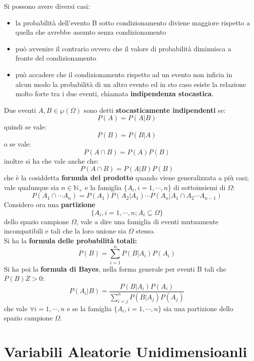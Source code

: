 \documentclass[a4paper,12pt, oneside]{book}
\begin{document}
Si possono avere diversi casi:
\begin{itemize}
    \item la probabilità dell’evento B sotto condizionamento diviene maggiore rispetto a quella che avrebbe assunto senza condizionamento
    \item può avvenire il contrario ovvero che il valore di probabilità diminuisca a fronte del condizionamento
    \item può accadere che il condizionamento rispetto ad un evento non inficia in alcun modo la probabilità di 
          un altro evento ed in sto caso esiste la relazione molto forte tra i due eventi, chiamata \textbf{indipendenza stocastica}.
\end{itemize}
Due eventi $A,B\in\wp(\Omega)$ sono detti \textbf{stocasticamente indipendenti} se:
\[P(A)=P(A|B)\]
quindi se vale:
\[P(B)=P(B|A)\]
o se vale:
\[P(A\cap B)=P(A)P(B)\]
inoltre si ha che vale anche che:
\[P(A\cap B)=P(A|B)P(B)\]
che è la cosiddetta \textbf{formula del prodotto} quando viene generalizzata a più casi; vale qualunque sia $n\in \mathbb{N}_+$ e la famiglia $\{A_i,i=1,\cdots, n\}$ di sottoinsiemi di $\Omega$:
\[P(A_1\cap\cdots A_n)=P(A_1)P(A_2|A_1)\cdots P(A_n|A_1\cap A_2\cdots A_{n-1})\]
Considero ora una \textbf{partizione} 
\[\{A_i, i=1,\cdots,n;A_i\subseteq \Omega\}\]
dello spazio campione $\Omega$, vale a dire una famiglia di eventi mutuamente incompatibili e
tali che la loro unione sia $\Omega$ stesso. \\
Si ha la \textbf{formula delle probabilità totali:}
\[P(B)=\sum_{i=1}^n P(B|A_i)P(A_i)\]
Si ha poi la \textbf{formula di Bayes}, nella forma generale per eventi B tali che $P(B)Z>0$:
\[P(A_i|B)=\frac{P(B|A_i)P(A_i)}{\sum_{i=j}^n P(B|A_j)P(A_j)}\]
che vale $\forall i=1,\cdots, n$ e se la famiglia $\{A_i,i=1,\cdots, n\}$ sia una partizione dello spazio campione $\Omega$.
\section{Variabili Aleatorie Unidimensioanli}
\end{document}
